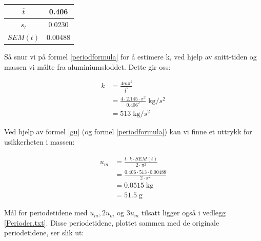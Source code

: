 \begin{center}
\begin{tabular}{  | c | c |}
    \hline
    $\overline{t}$ & 0.406\\
    \hline
    $s_t$ & 0.0230\\
    \hline
    $SEM(t)$ & 0.00488\\
    \hline
\end{tabular}
\end{center}

Så snur vi på formel \ref{periodformula} for å estimere k, ved hjelp av snitt-tiden og massen vi målte fra aluminiumsloddet. Dette gir oss:

\begin{align*}
    k &= \frac{4m\pi^2}{\overline{t}^2}\\
      &= \frac{4\cdot 2.145 \cdot \pi^2}{0.406^2} \; \text{kg/$s^2$}\\
      &= 513 \; \text{kg/$s^2$}
\end{align*}

Ved hjelp av formel \ref{gu} (og formel \ref{periodformula}) kan vi finne et uttrykk for usikkerheten i massen:

\begin{align*}
    u_m &= \frac{\overline{t}\cdot k \cdot SEM(t)}{2\cdot\pi^2}\\
    &= \frac{0.406 \cdot 513 \cdot 0.00488}{2\cdot \pi^2}\\
    &= 0.0515 \; \text{kg}\\
    &= 51.5 \; \text{g}
\end{align*}

Mål for periodetidene med $u_m, 2u_m$ og $3u_m$ tilsatt ligger også i vedlegg \ref{Perioder.txt}.
Disse periodetidene, plottet sammen med de originale periodetidene, ser slik ut:

